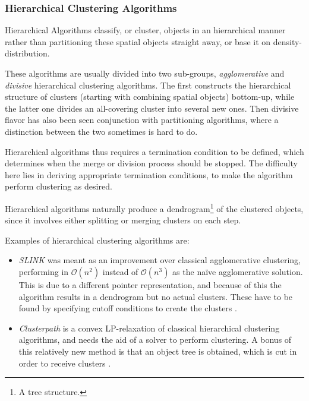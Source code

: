 \subsubsection{Hierarchical Clustering Algorithms}

Hierarchical Algorithms classify, or cluster, objects in an hierarchical manner 
rather than partitioning these spatial objects straight away, or base it on 
density-distribution.

These algorithms are usually divided into two sub-groups, \emph{agglomerative} 
and \emph{divisive} hierarchical clustering algorithms. The first
constructs the hierarchical structure of clusters (starting with combining 
spatial objects) bottom-up, while the latter one divides an all-covering 
cluster into several new ones. Then divisive flavor has also been seen 
conjunction with partitioning algorithms, where a distinction between the two 
sometimes is hard to do.

Hierarchical algorithms thus requires a termination condition to be 
defined, which determines when the merge or division process should be 
stopped. The difficulty here lies in deriving appropriate termination 
conditions, to make the algorithm perform clustering as desired.

Hierarchical algorithms naturally produce a dendrogram\footnote{
    A tree structure.
} of the clustered objects, since it involves either splitting or 
merging clusters on each step.

Examples of hierarchical clustering algorithms are:
\begin{itemize}
    \item \emph{SLINK} was meant as an improvement over classical
        agglomerative clustering, performing in $\mathcal{O}(n^2)$ instead
        of $\mathcal{O}(n^3)$ as the naïve agglomerative solution. This is 
        due to a different 
        pointer representation, and because of this the algorithm results
        in a dendrogram but no actual clusters. These have to be found 
        by specifying cutoff conditions to create the clusters \cite{SLINK}.
    \item \emph{Clusterpath} is a convex LP-relaxation of classical 
        hierarchical clustering algorithms, and needs the aid of a solver
        to perform clustering. A bonus of this relatively new method
        is that an object tree is obtained, which is cut in order to receive
        clusters \cite{clusterpath}.
\end{itemize}


